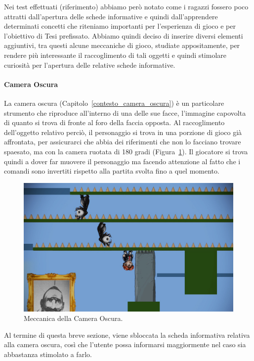 Nei test effettuati (riferimento) abbiamo però notato come i ragazzi fossero poco attratti dall’apertura delle schede informative e quindi dall’apprendere determinati concetti che riteniamo importanti per l’esperienza di gioco e per l’obiettivo di Tesi prefissato.
Abbiamo quindi deciso di inserire diversi elementi aggiuntivi, tra questi alcune meccaniche di gioco, studiate appositamente, per rendere più interessante il raccoglimento di tali oggetti e quindi stimolare curiosità per l’apertura delle relative schede informative.

\paragraph{Camera Oscura}
\label{par_meccanica_camera_oscura}
La camera oscura (Capitolo~\ref{contesto_camera_oscura}) è un particolare strumento che riproduce all’interno di una delle sue facce, l’immagine capovolta di quanto si trova di fronte al foro della faccia opposta.
Al raccoglimento dell’oggetto relativo perciò, il personaggio si trova in una porzione di gioco già affrontata, per assicurarci che abbia dei riferimenti che non lo facciano trovare spaesato, ma con la camera ruotata di 180 gradi (Figura~\ref{fig:meccaniche_precinema_camera_oscura}). Il giocatore si trova quindi a dover far muovere il personaggio ma facendo attenzione al fatto che i comandi sono invertiti rispetto alla partita svolta fino a quel momento.

\begin{figure}%
	\centering
	\includegraphics[width= 0.8\columnwidth]{images/gameDesign/23_cameraOscura.jpg}
	\caption{Meccanica della Camera Oscura.}
	\label{fig:meccaniche_precinema_camera_oscura}
\end{figure} 

Al termine di questa breve sezione, viene sbloccata la scheda informativa relativa alla camera oscura, così che l’utente possa informarsi maggiormente nel caso sia abbastanza stimolato a farlo.

